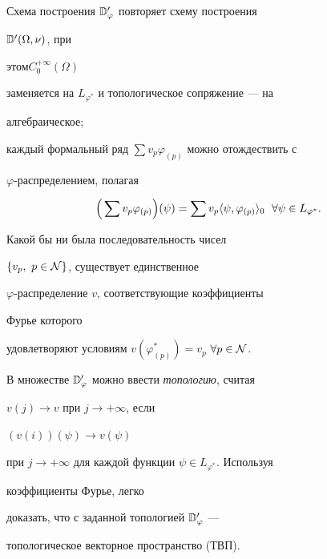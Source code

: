 \begin{notes} 


Схема построения $\Bbb D'_\varphi$ повторяет схему построения 


$\Bbb D'(\Omega,\nu)$, при 


этом\linebreak $C^{+\infty}_0(\Omega)$ 


заменяется на $L_{\varphi^*}$ и топологическое сопряжение --- на 


алгебраическое; 


каждый формальный ряд $\sum v_p\varphi_{(p)}$ можно отождествить с 


$\varphi$-распределением, полагая 


$$ 


\Big(\sum v_p\varphi_{(p)}\Big)(\psi)=\sum v_p 


\la\psi,\varphi_{(p)}\ra_0\ \; \forall\psi\in L_{\varphi^*}.


$$ 


Какой бы ни была последовательность чисел 


$\{v_p,\ p\in \cal N\}$, существует единственное 


$\varphi$-рас\-пре\-де\-ле\-ние $v$, соответствующие коэффициенты


Фурье которого 


удовлетворяют условиям $v(\varphi^*_{(p)})=v_p$ $\forall p\in\cal N$. 


\end{notes} 


 


В множестве $\Bbb D'_\varphi$ можно ввести {\it топологию}, считая 


$v(j)\to v$ при $j\to+\infty$, если 


$(v(i))(\psi)\to v(\psi)$ 


при $j\to+\infty$ для каждой функции $\psi\in L_{\varphi^*}$. Используя 


коэффициенты Фурье, легко 


доказать, что с заданной топологией $\Bbb D'_\varphi$ --- 


топологическое векторное пространство (ТВП). 


 


